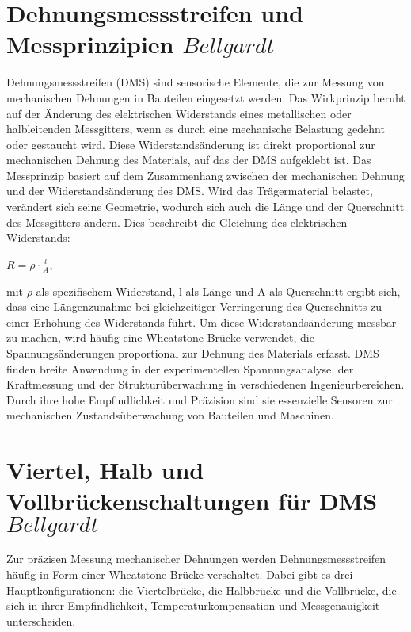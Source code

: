 \section{Dehnungsmessstreifen und Messprinzipien \(Bellgardt\)}
Dehnungsmessstreifen (DMS) sind sensorische Elemente, die zur Messung von mechanischen Dehnungen in Bauteilen eingesetzt werden. Das Wirkprinzip beruht auf der Änderung des elektrischen Widerstands eines metallischen oder halbleitenden Messgitters, wenn es durch eine mechanische Belastung gedehnt oder gestaucht wird. Diese Widerstandsänderung ist direkt proportional zur mechanischen Dehnung des Materials, auf das der DMS aufgeklebt ist. 
Das Messprinzip basiert auf dem Zusammenhang zwischen der mechanischen Dehnung und der Widerstandsänderung des DMS. Wird das Trägermaterial belastet, verändert sich seine Geometrie, wodurch sich auch die Länge und der Querschnitt des Messgitters ändern. Dies beschreibt die Gleichung des elektrischen Widerstands:

$R = \rho \cdot \frac{l}{A}$,

mit $\rho$ als spezifischem Widerstand, l als Länge und A als Querschnitt ergibt sich, dass eine Längenzunahme bei gleichzeitiger Verringerung des Querschnitts zu einer Erhöhung des Widerstands führt. Um diese Widerstandsänderung messbar zu machen, wird häufig eine Wheatstone-Brücke verwendet, die Spannungsänderungen proportional zur Dehnung des Materials erfasst.
DMS finden breite Anwendung in der experimentellen Spannungsanalyse, der Kraftmessung und der Strukturüberwachung in verschiedenen Ingenieurbereichen. Durch ihre hohe Empfindlichkeit und Präzision sind sie essenzielle Sensoren zur mechanischen Zustandsüberwachung von Bauteilen und Maschinen.










\newpage{}
\section{Viertel\-, Halb\- und Vollbr\"uckenschaltungen für DMS \(Bellgardt\)}
Zur präzisen Messung mechanischer Dehnungen werden Dehnungsmessstreifen häufig in Form einer Wheatstone-Brücke verschaltet. Dabei gibt es drei Hauptkonfigurationen: die Viertelbrücke, die Halbbrücke und die Vollbrücke, die sich in ihrer Empfindlichkeit, Temperaturkompensation und Messgenauigkeit unterscheiden.

